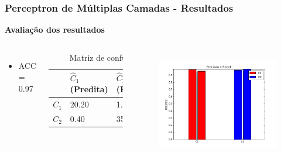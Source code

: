 \documentclass{beamer}
\begin{document}
\begin{frame}
\frametitle{Perceptron de Múltiplas Camadas - Resultados}
\textbf{Avaliação dos resultados}
\begin{columns}[c] 
\begin{itemize}
\item ACC = 0.97
\end{itemize}

\begin{table}
\begin{tabular}{l l l}
\toprule
 & \textbf{$\hat{C}_1$ (Predita)} & \textbf{$\hat{C}_2$(Predita)}\\
\midrule
$C_1$ & 20.20&1.00\\
$C_2$ & 0.40&35.30\\ 
\bottomrule
\end{tabular}
\caption{Matriz de confusão}
\end{table}


\begin{figure}[H]
\centering
  \includegraphics[width=\linewidth]{../img/mlp_rec.png}
  \label{fig:percep}
\end{figure}%

\end{columns}

\end{frame}
\end{document}
